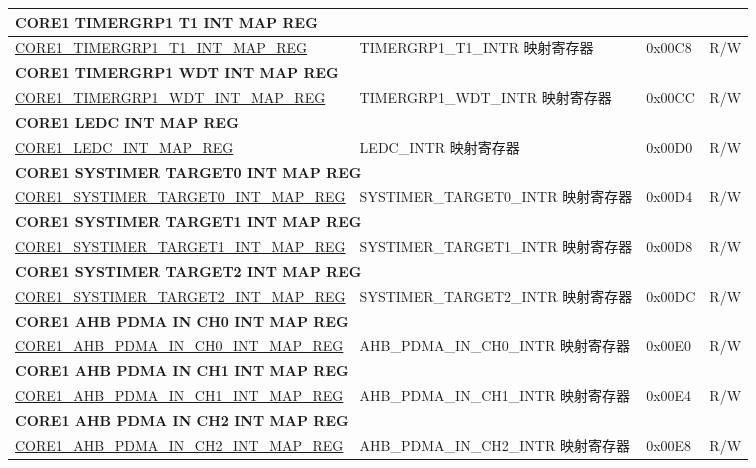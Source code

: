 \begin{longtable}{ | p{7.5cm} | p{7.2cm} | p{1.3cm} | p{1cm} | }
\multicolumn{4}{|l|}{\textbf{CORE1 TIMERGRP1 T1 INT MAP REG}} \\ \hline
\hyperref[regdesc:CORE1TIMERGRP1T1INTMAPREG]{CORE1\_TIMERGRP1\_T1\_INT\_MAP\_REG} & TIMERGRP1\_T1\_INTR 映射寄存器 & 0x00C8 & R/W \\ \hline
\multicolumn{4}{|l|}{\textbf{CORE1 TIMERGRP1 WDT INT MAP REG}} \\ \hline
\hyperref[regdesc:CORE1TIMERGRP1WDTINTMAPREG]{CORE1\_TIMERGRP1\_WDT\_INT\_MAP\_REG} & TIMERGRP1\_WDT\_INTR 映射寄存器 & 0x00CC & R/W \\ \hline
\multicolumn{4}{|l|}{\textbf{CORE1 LEDC INT MAP REG}} \\ \hline
\hyperref[regdesc:CORE1LEDCINTMAPREG]{CORE1\_LEDC\_INT\_MAP\_REG} & LEDC\_INTR 映射寄存器 & 0x00D0 & R/W \\ \hline
\multicolumn{4}{|l|}{\textbf{CORE1 SYSTIMER TARGET0 INT MAP REG}} \\ \hline
\hyperref[regdesc:CORE1SYSTIMERTARGET0INTMAPREG]{CORE1\_SYSTIMER\_TARGET0\_INT\_MAP\_REG} & SYSTIMER\_TARGET0\_INTR 映射寄存器 & 0x00D4 & R/W \\ \hline
\multicolumn{4}{|l|}{\textbf{CORE1 SYSTIMER TARGET1 INT MAP REG}} \\ \hline
\hyperref[regdesc:CORE1SYSTIMERTARGET1INTMAPREG]{CORE1\_SYSTIMER\_TARGET1\_INT\_MAP\_REG} & SYSTIMER\_TARGET1\_INTR 映射寄存器 & 0x00D8 & R/W \\ \hline
\multicolumn{4}{|l|}{\textbf{CORE1 SYSTIMER TARGET2 INT MAP REG}} \\ \hline
\hyperref[regdesc:CORE1SYSTIMERTARGET2INTMAPREG]{CORE1\_SYSTIMER\_TARGET2\_INT\_MAP\_REG} & SYSTIMER\_TARGET2\_INTR 映射寄存器 & 0x00DC & R/W \\ \hline
\multicolumn{4}{|l|}{\textbf{CORE1 AHB PDMA IN CH0 INT MAP REG}} \\ \hline
\hyperref[regdesc:CORE1AHBPDMAINCH0INTMAPREG]{CORE1\_AHB\_PDMA\_IN\_CH0\_INT\_MAP\_REG} & AHB\_PDMA\_IN\_CH0\_INTR 映射寄存器 & 0x00E0 & R/W \\ \hline
\multicolumn{4}{|l|}{\textbf{CORE1 AHB PDMA IN CH1 INT MAP REG}} \\ \hline
\hyperref[regdesc:CORE1AHBPDMAINCH1INTMAPREG]{CORE1\_AHB\_PDMA\_IN\_CH1\_INT\_MAP\_REG} & AHB\_PDMA\_IN\_CH1\_INTR 映射寄存器 & 0x00E4 & R/W \\ \hline
\multicolumn{4}{|l|}{\textbf{CORE1 AHB PDMA IN CH2 INT MAP REG}} \\ \hline
\hyperref[regdesc:CORE1AHBPDMAINCH2INTMAPREG]{CORE1\_AHB\_PDMA\_IN\_CH2\_INT\_MAP\_REG} & AHB\_PDMA\_IN\_CH2\_INTR 映射寄存器 & 0x00E8 & R/W \\ \hline

\end{longtable}
